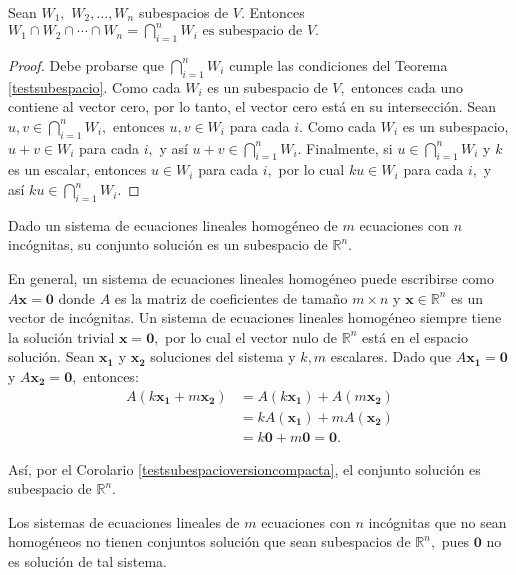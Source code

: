 \begin{theorem}\label{interseccionsubespacios}
Sean $W_1,$ $W_2,\dots, W_n$ subespacios de $V$. Entonces $W_1\cap W_2 \cap \cdots \cap W_n =\bigcap_{i=1}^{n} W_i\text{ es subespacio de }V.$

\begin{proof} Debe probarse que $\bigcap_{i=1}^{n} W_i$ cumple las condiciones del Teorema \ref{testsubespacio}. Como cada $W_i$ es un subespacio de $V,$ entonces cada uno contiene al vector cero, por lo tanto, el vector cero está en su intersección. Sean $u,v\in \bigcap_{i=1}^{n} W_i,$ entonces $u,v\in W_i$ para cada $i.$ Como cada $W_i$ es un subespacio, $u+v\in W_i$ para cada $i,$ y así $u+v\in \bigcap_{i=1}^{n} W_i.$ Finalmente, si $u\in \bigcap_{i=1}^{n} W_i$ y $k$ es un escalar, entonces $u\in W_i$ para cada $i,$ por lo cual $ku\in W_i$ para cada $i,$ y así $ku\in \bigcap_{i=1}^{n} W_i.$
\end{proof}
\end{theorem}

\begin{example}\label{thm:carsisthom}
Dado un sistema de ecuaciones lineales homogéneo de $m$ ecuaciones con $n$ incógnitas, su conjunto solución es un subespacio de $\mathbb{R}^n.$
\begin{myproof}
En general, un sistema de ecuaciones lineales homogéneo puede escribirse como $A\mathbf{x}=\mathbf{0}$ donde $A$ es la matriz de coeficientes de tamaño $m\times n$ y $\mathbf{x}\in\mathbb{R}^n$ es un vector de incógnitas. Un sistema de ecuaciones lineales homogéneo siempre tiene la solución trivial $\mathbf{x}=\mathbf{0},$ por lo cual el vector nulo de $\mathbb{R}^n$ está en el espacio solución. Sean $\mathbf{x_1}$ y $\mathbf{x_2}$ soluciones del sistema y $k,m$ escalares. Dado que $A\mathbf{x_1}=\mathbf{0}$ y $A\mathbf{x_2}=\mathbf{0},$ entonces: 
\begin{align*}
A\left( k\mathbf{x_1}+m\mathbf{x_2} \right)&=A\left(k\mathbf{x_1}\right)+A\left(m\mathbf{x_2}\right)\\&=kA\left(\mathbf{x_1}\right)+mA\left(\mathbf{x_2}\right)\\&=k\mathbf{0}+m\mathbf{0}=\mathbf{0}.
\end{align*}

Así, por el Corolario \ref{testsubespacioversioncompacta}, el conjunto solución es subespacio de $\mathbb{R}^n.$ 
\end{myproof}
\end{example}
\begin{rem} Los sistemas de ecuaciones lineales de $m$ ecuaciones con $n$ incógnitas que no sean homogéneos no tienen conjuntos solución que sean subespacios de $\mathbb{R}^n,$ pues $\mathbf{0}$ no es solución de tal sistema.
\end{rem}

